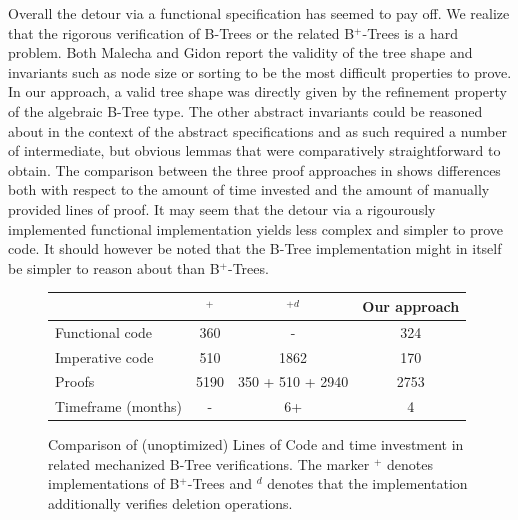 Overall the detour via a functional specification has seemed to pay off.
We realize that the rigorous verification of B-Trees or the related B$^+$-Trees
is a hard problem.
Both Malecha and Gidon report the validity of the tree shape
and invariants such as node size or sorting
to be the most difficult properties to prove.
In our approach, a valid tree shape was directly given
by the refinement property of the algebraic B-Tree type.
The other abstract invariants could be reasoned about
in the context of the abstract specifications and as such
required a number of intermediate, but obvious
lemmas that were comparatively straightforward to obtain.
The comparison between the three proof approaches in \label{fig:proof-comparison}
shows differences both with respect to the amount of 
time invested and the amount of manually provided lines of proof.
It may seem that the detour via a rigourously implemented
functional implementation yields less complex and
simpler to prove code.
It should however be noted that the B-Tree implementation
might in itself be simpler to reason about than B$^+$-Trees.

\begin{figure}
    \centering
    \begin{tabular}{l|c|c|c}
        \                & \parencite{DBLP:conf/popl/MalechaMSW10}$^{+}$ & \parencite{DBLP:journals/sosym/ErnstSR15}$^{+d}$ & Our approach \\
        \hline
        Functional code &   360      & -                    & 324  \\
        Imperative code &   510      & 1862                  & 170  \\
        Proofs          &  5190      & 350 + 510 + 2940\footnotemark[1] & 2753 \\
        Timeframe (months) &  -     & 6+                      & 4   \\
    \end{tabular}
    \caption[Comparison of (unoptimized) Lines of Code and time investment in related mechanized B-Tree verifications.]
    {Comparison of (unoptimized) Lines of Code and time investment in related mechanized B-Tree verifications.
    The marker $^+$ denotes implementations of B$^+$-Trees
    and $^d$ denotes that the implementation additionally verifies deletion operations.
    }
    \label{fig:proof-comparison}
\end{figure}

